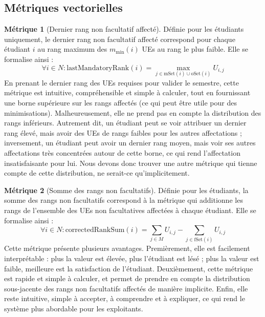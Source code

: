 \documentclass{rapport}
\theoremstyle{definition}
\theoremstyle{remark}
\theoremstyle{plain}
\theoremstyle{definition}
\newtheorem*{metric}{Métrique}
\theoremstyle{definition}
\theoremstyle{remark}
\theoremstyle{definition}
\begin{document}
\subsection{Métriques vectorielles}
\begin{metric}[Dernier rang non facultatif affecté]
    Définie pour les étudiants uniquement, le dernier rang non facultatif affecté correspond pour chaque étudiant $i$ au rang maximum des $m_{\min}(i)$ UEs au rang le plus faible.
    Elle se formalise ainsi :
    $$
        \forall i\in N : \text{lastMandatoryRank}(i) = \max_{j\in \text{mSet}(i)\cup\text{oSet}(i)} U_{i,j}
    $$
    En prenant le dernier rang des UEs requises pour valider le semestre, cette métrique est intuitive, compréhensible et simple à calculer, tout en fournissant une borne supérieure sur les rangs affectés (ce qui peut être utile pour des minimisations).
    Malheureusement, elle ne prend pas en compte la distribution des rangs inférieurs.
    Autrement dit, un étudiant peut se voir attribuer un dernier rang élevé, mais avoir des UEs de rangs faibles pour les autres affectations ; inversement, un étudiant peut avoir un dernier rang moyen, mais voir ses autres affectations très concentrées autour de cette borne, ce qui rend l'affectation insatisfaisante pour lui.
    Nous devons donc trouver une autre métrique qui tienne compte de cette distribution, ne serait-ce qu'implicitement.
\end{metric}

\begin{metric}[Somme des rangs non facultatifs]
    Définie pour les étudiants, la somme des rangs non facultatifs correspond à la métrique qui additionne les rangs de l'ensemble des UEs non facultatives affectées à chaque étudiant.
    Elle se formalise ainsi :
    $$
        \forall i\in N : \text{correctedRankSum}(i) = \sum_{j\in M} U_{i,j}-\sum_{j\in\text{fSet}(i)} U_{i,j}
    $$
    Cette métrique présente plusieurs avantages.
    Premièrement, elle est facilement interprétable : plus la valeur est élevée, plus l'étudiant est lésé ; plus la valeur est faible, meilleure est la satisfaction de l'étudiant.
    Deuxièmement, cette métrique est rapide et simple à calculer, et permet de prendre en compte la distribution sous-jacente des rangs non facultatifs affectés de manière implicite.
    Enfin, elle reste intuitive, simple à accepter, à comprendre et à expliquer, ce qui rend le système plus abordable pour les exploitants.
\end{metric}
\end{document}
